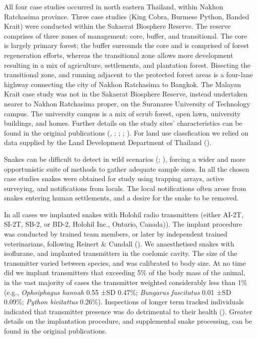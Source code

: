 \documentclass[10pt,a4paper]{article}
\begin{document}
All four case studies occurred in north eastern Thailand, within Nakhon Ratchasima province.
Three case studies (King Cobra, Burmese Python, Banded Krait) were conducted within the Sakaerat Biosphere Reserve.
The reserve comprises of three zones of management: core, buffer, and transitional.
The core is largely primary forest; the buffer surrounds the core and is comprised of forest regeneration efforts, whereas the transitional zone allows more development resulting in a mix of agriculture, settlements, and plantation forest.
Bisecting the transitional zone, and running adjacent to the protected forest areas is a four-lane highway connecting the city of Nakhon Ratchasima to Bangkok.
The Malayan Krait case study was not in the Sakaerat Biosphere Reserve, instead undertaken nearer to Nakhon Ratchasima proper, on the Suranaree University of Technology campus.
The university campus is a mix of scrub forest, open lawn, university buildings, and homes.
Further details on the study sites' characteristics can be found in the original publications (, ; ; ; ).
For land use classfication we relied on data supplied by the Land Development Department of Thailand ().

Snakes can be difficult to detect in wild scenarios (; ), forcing a wider and more opportunistic suite of methods to gather adequate sample sizes.
In all the chosen case studies snakes were obtained for study using trapping arrays, active surveying, and notifications from locals.
The local notifications often arose from snakes entering human settlements, and a desire for the snake to be removed.

In all cases we implanted snakes with Holohil radio transmitters (either AI-2T, SI-2T, SB-2, or BD-2, Holohil Inc., Ontario, Canada)).
The implant procedure was conducted by trained team members, or later by independent trained veterinarians, following Reinert \& Cundall ().
We anaesthetised snakes with isoflurane, and implanted transmitters in the coelomic cavity.
The size of the transmitter varied between species, and was calibrated to body size.
At no time did we implant transmitters that exceeding 5\% of the body mass of the animal, in the vast majority of cases the transmitter weighted considerably less than 1\% (e.g., \emph{Ophoiphagus hannah} 0.55 ±SD 0.47\%; \emph{Bungarus fascitatus} 0.01 ±SD 0.09\%; \emph{Python bivitattus} 0.26\%).
Inspections of longer term tracked individuals indicated that transmitter presence was do detrimental to their health ().
Greater details on the implantation procedure, and supplemental snake processing, can be found in the original publications.
\end{document}

